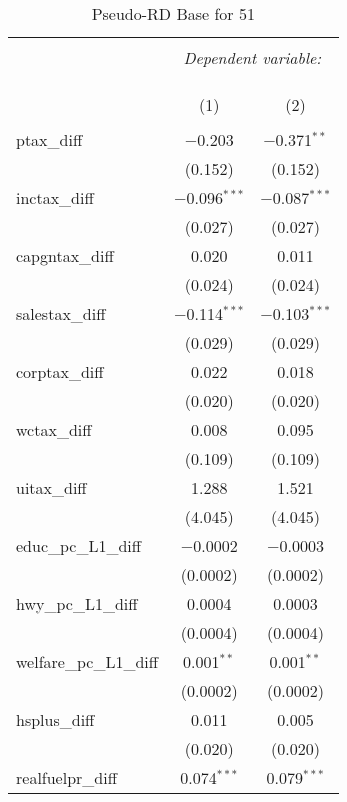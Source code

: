 
\begin{table}[!htbp] \centering 
  \caption{Pseudo-RD Base for  51} 
  \label{} 
\begin{tabular}{@{\extracolsep{5pt}}lcc} 
\\[-1.8ex]\hline 
\hline \\[-1.8ex] 
 & \multicolumn{2}{c}{\textit{Dependent variable:}} \\ 
\cline{2-3} 
\\[-1.8ex] & \multicolumn{2}{c}{ } \\ 
\\[-1.8ex] & (1) & (2)\\ 
\hline \\[-1.8ex] 
 ptax\_diff & $-$0.203 & $-$0.371$^{**}$ \\ 
  & (0.152) & (0.152) \\ 
  inctax\_diff & $-$0.096$^{***}$ & $-$0.087$^{***}$ \\ 
  & (0.027) & (0.027) \\ 
  capgntax\_diff & 0.020 & 0.011 \\ 
  & (0.024) & (0.024) \\ 
  salestax\_diff & $-$0.114$^{***}$ & $-$0.103$^{***}$ \\ 
  & (0.029) & (0.029) \\ 
  corptax\_diff & 0.022 & 0.018 \\ 
  & (0.020) & (0.020) \\ 
  wctax\_diff & 0.008 & 0.095 \\ 
  & (0.109) & (0.109) \\ 
  uitax\_diff & 1.288 & 1.521 \\ 
  & (4.045) & (4.045) \\ 
  educ\_pc\_L1\_diff & $-$0.0002 & $-$0.0003 \\ 
  & (0.0002) & (0.0002) \\ 
  hwy\_pc\_L1\_diff & 0.0004 & 0.0003 \\ 
  & (0.0004) & (0.0004) \\ 
  welfare\_pc\_L1\_diff & 0.001$^{**}$ & 0.001$^{**}$ \\ 
  & (0.0002) & (0.0002) \\ 
  hsplus\_diff & 0.011 & 0.005 \\ 
  & (0.020) & (0.020) \\ 
  realfuelpr\_diff & 0.074$^{***}$ & 0.079$^{***}$ \\ 

\end{tabular}
\end{table}
